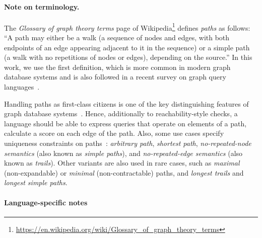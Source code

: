 \paragraph{Note on terminology.} The \emph{Glossary of graph theory terms} page of Wikipedia\footnote{\url{https://en.wikipedia.org/wiki/Glossary_of_graph_theory_terms}} defines \emph{paths} as follows: ``A path may either be a walk (a sequence of nodes and edges, with both endpoints of an edge appearing adjacent to it in the sequence) or a simple path (a walk with no repetitions of nodes or edges), depending on the source.''
In this work, we use the first definition, which is more common in modern graph database systems and is also followed in a recent survey on graph query languages~\cite{DBLP:journals/csur/AnglesABHRV17}.

Handling paths as first-class citizens is one of the key distinguishing features of graph database 
systems~\cite{DBLP:conf/sigmod/AnglesABBFGLPPS18}. Hence, additionally to
reachability-style checks, a language should be able to express
queries that operate on elements of a path, \eg calculate a score on each edge
of the path.
Also, some use cases specify uniqueness constraints on paths~\cite{DBLP:journals/csur/AnglesABHRV17}:
\emph{arbitrary path},
\emph{shortest path},
\emph{no-repeated-node semantics} (also known as \emph{simple paths}), and
\emph{no-repeated-edge semantics} (also known as \emph{trails}).
Other variants are also used in rare cases, such as \emph{maximal} (non-expandable) or \emph{minimal} (non-contractable) paths, and \emph{longest trails} and \emph{longest simple paths}.

\paragraph{Language-specific notes}


